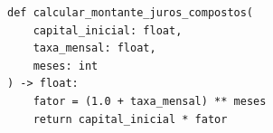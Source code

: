 \ifmostrarGabarito
\begin{verbatim}
def calcular_montante_juros_compostos(
    capital_inicial: float,
    taxa_mensal: float,
    meses: int
) -> float:
    fator = (1.0 + taxa_mensal) ** meses
    return capital_inicial * fator
\end{verbatim}

\fi
